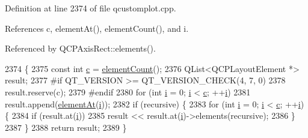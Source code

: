 Definition at line 2374 of file qcustomplot.\+cpp.



References c, element\+At(), element\+Count(), and i.



Referenced by Q\+C\+P\+Axis\+Rect\+::elements().


\begin{DoxyCode}
2374                                                                   \{
2375   \textcolor{keyword}{const} \textcolor{keywordtype}{int} \hyperlink{_comparision_pictures_2_createtest_image_8m_ae0323a9039add2978bf5b49550572c7c}{c} = \hyperlink{class_q_c_p_layout_a39d3e9ef5d9b82ab1885ba1cb9597e56}{elementCount}();
2376   QList<QCPLayoutElement *> result;
2377 \textcolor{preprocessor}{#if QT\_VERSION >= QT\_VERSION\_CHECK(4, 7, 0)}
2378   result.reserve(c);
2379 \textcolor{preprocessor}{#endif}
2380   \textcolor{keywordflow}{for} (\textcolor{keywordtype}{int} \hyperlink{_comparision_pictures_2_createtest_image_8m_a6f6ccfcf58b31cb6412107d9d5281426}{i} = 0; \hyperlink{_comparision_pictures_2_createtest_image_8m_a6f6ccfcf58b31cb6412107d9d5281426}{i} < \hyperlink{_comparision_pictures_2_createtest_image_8m_ae0323a9039add2978bf5b49550572c7c}{c}; ++\hyperlink{_comparision_pictures_2_createtest_image_8m_a6f6ccfcf58b31cb6412107d9d5281426}{i})
2381     result.append(\hyperlink{class_q_c_p_layout_afa73ca7d859f8a3ee5c73c9b353d2a56}{elementAt}(\hyperlink{_comparision_pictures_2_createtest_image_8m_a6f6ccfcf58b31cb6412107d9d5281426}{i}));
2382   \textcolor{keywordflow}{if} (recursive) \{
2383     \textcolor{keywordflow}{for} (\textcolor{keywordtype}{int} \hyperlink{_comparision_pictures_2_createtest_image_8m_a6f6ccfcf58b31cb6412107d9d5281426}{i} = 0; \hyperlink{_comparision_pictures_2_createtest_image_8m_a6f6ccfcf58b31cb6412107d9d5281426}{i} < \hyperlink{_comparision_pictures_2_createtest_image_8m_ae0323a9039add2978bf5b49550572c7c}{c}; ++\hyperlink{_comparision_pictures_2_createtest_image_8m_a6f6ccfcf58b31cb6412107d9d5281426}{i}) \{
2384       \textcolor{keywordflow}{if} (result.at(\hyperlink{_comparision_pictures_2_createtest_image_8m_a6f6ccfcf58b31cb6412107d9d5281426}{i}))
2385         result << result.at(\hyperlink{_comparision_pictures_2_createtest_image_8m_a6f6ccfcf58b31cb6412107d9d5281426}{i})->elements(recursive);
2386     \}
2387   \}
2388   \textcolor{keywordflow}{return} result;
2389 \}
\end{DoxyCode}


